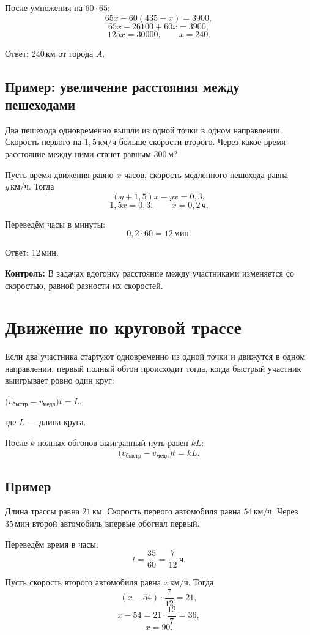 \documentclass[a4paper,12pt]{article}
\newcommand{\unit}[1]{\,\text{#1}}
\newcommand{\formula}[1]{%
  \begin{center}
    \large\color{darkaccent}\ensuremath{#1}
  \end{center}
}
\newcommand{\checkpoint}[1]{%
  \par\smallskip
  {\color{warn}\textbf{Контроль:} #1}\par\smallskip
}
\begin{document}
После умножения на $60\cdot65$:
\[
65x-60(435-x)=3900,
\]
\[
65x-26100+60x=3900,
\]
\[
125x=30000,
\qquad
x=240.
\]

Ответ: $240\unit{км}$ от города $A$.

\subsection{Пример: увеличение расстояния между пешеходами}

Два пешехода одновременно вышли из одной точки в одном направлении.
Скорость первого на $1{,}5\unit{км/ч}$ больше скорости второго.
Через какое время расстояние между ними станет равным $300\unit{м}$?

Пусть время движения равно $x$ часов,
скорость медленного пешехода равна $y\unit{км/ч}$.
Тогда
\[
(y+1{,}5)x-yx=0{,}3,
\]
\[
1{,}5x=0{,}3,
\qquad
x=0{,}2\unit{ч}.
\]

Переведём часы в минуты:
\[
0{,}2\cdot60=12\unit{мин}.
\]

Ответ: $12\unit{мин}$.

\checkpoint{
  В задачах вдогонку расстояние между участниками изменяется
  со скоростью, равной разности их скоростей.
}

\section{Движение по круговой трассе}

Если два участника стартуют одновременно из одной точки и движутся
в одном направлении, первый полный обгон происходит тогда,
когда быстрый участник выигрывает ровно один круг:
\formula{
  \bigl(v_{\text{быстр}}-v_{\text{медл}}\bigr)t=L,
}
где $L$ --- длина круга.

После $k$ полных обгонов выигранный путь равен $kL$:
\[
\bigl(v_{\text{быстр}}-v_{\text{медл}}\bigr)t=kL.
\]

\subsection{Пример}

Длина трассы равна $21\unit{км}$.
Скорость первого автомобиля равна $54\unit{км/ч}$.
Через $35\unit{мин}$ второй автомобиль впервые обогнал первый.

Переведём время в часы:
\[
t
=
\frac{35}{60}
=
\frac{7}{12}\unit{ч}.
\]

Пусть скорость второго автомобиля равна $x\unit{км/ч}$.
Тогда
\[
(x-54)\cdot\frac{7}{12}=21,
\]
\[
x-54=21\cdot\frac{12}{7}=36,
\]
\[
x=90.
\]
\end{document}
